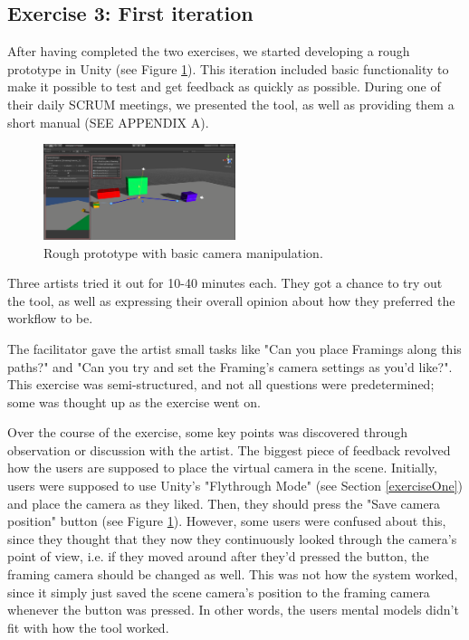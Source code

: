 \subsection{Exercise 3: First iteration}
After having completed the two exercises, we started developing a rough prototype in Unity (see Figure \ref{fig:prototype}). This iteration included basic functionality to make it possible to test and get feedback as quickly as possible. During one of their daily SCRUM meetings, we presented the tool, as well as providing them a short manual (SEE APPENDIX A).


\begin{figure}[htbp]
\centering
\includegraphics[width=0.50\textwidth]{Pics/MainSetup}
\caption{Rough prototype with basic camera manipulation.}
\label{fig:prototype}
\end{figure}

Three artists tried it out for 10-40 minutes each. They got a chance to try out the tool, as well as expressing their overall opinion about how they preferred the workflow to be.

The facilitator gave the artist small tasks like "Can you place Framings along this paths?" and "Can you try and set the Framing's camera settings as you'd like?". This exercise was semi-structured, and not all questions were predetermined; some was thought up as the exercise went on.

Over the course of the exercise, some key points was discovered through observation or discussion with the artist. The biggest piece of feedback revolved how the users are supposed to place the virtual camera in the scene. Initially, users were supposed to use Unity's "Flythrough Mode" (see Section \ref{exerciseOne}) and place the camera as they liked. Then, they should press the "Save camera position" button (see Figure \ref{fig:prototype}). However, some users were confused about this, since they thought that they now they continuously looked through the camera's point of view, i.e. if they moved around after they'd pressed the button, the framing camera should be changed as well. This was not how the system worked, since it simply just saved the scene camera's position to the framing camera whenever the button was pressed. In other words, the users mental models didn't fit with how the tool worked.

